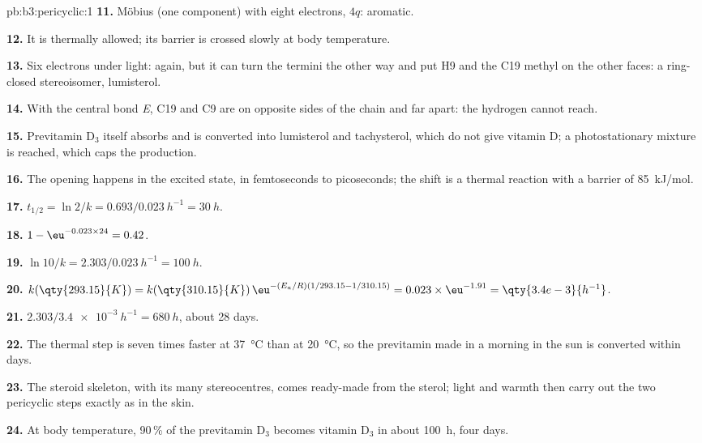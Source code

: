 \begin{solution}{pb:b3:pericyclic:1}
\textbf{11.} Möbius (one  component) with eight electrons, $4q$: aromatic.

\textbf{12.} It is thermally allowed; its barrier is crossed slowly at body temperature.

\textbf{13.} Six electrons under light:  again, but it can turn the termini the
other way and put H9 and the C19 methyl on the other faces: a ring-closed
stereoisomer, lumisterol.

\textbf{14.} With the central bond \textit{E}, C19 and C9 are on opposite sides of the chain and far
apart: the hydrogen cannot reach.

\textbf{15.} Previtamin D$_3$ itself absorbs and is converted into lumisterol and tachysterol,
which do not give vitamin D; a photostationary mixture is reached, which caps the
production.

\textbf{16.} The opening happens in the excited state, in femtoseconds to picoseconds;
the shift is a thermal reaction with a barrier of \qty{85}{kJ/mol}.

\textbf{17.} $t_{1/2} = \ln 2/k = 0.693/\qty{0.023}{h^{-1}} = \qty{30}{h}$.

\textbf{18.} $1 - \eu^{-0.023 \times 24} = 0.42$.

\textbf{19.} $\ln 10/k = 2.303/\qty{0.023}{h^{-1}} = \qty{100}{h}$.

\textbf{20.} $k(\qty{293.15}{K}) = k(\qty{310.15}{K})\,\eu^{-(E_a/R)(1/293.15 - 1/310.15)} = 0.023 \times \eu^{-1.91} = \qty{3.4e-3}{h^{-1}}$.

\textbf{21.} $2.303/\qty{3.4e-3}{h^{-1}} = \qty{680}{h}$, about 28 days.

\textbf{22.} The thermal step is seven times faster at \qty{37}{\celsius} than at \qty{20}{\celsius}, so the
previtamin made in a morning in the sun is converted within days.

\textbf{23.} The steroid skeleton, with its many stereocentres, comes ready-made from
the sterol; light and warmth then carry out the two pericyclic steps exactly as in
the skin.

\textbf{24.} At body temperature, 90\,\% of the previtamin D$_3$ becomes vitamin D$_3$ in about
\qty{100}{h}, four days.
\end{solution}
